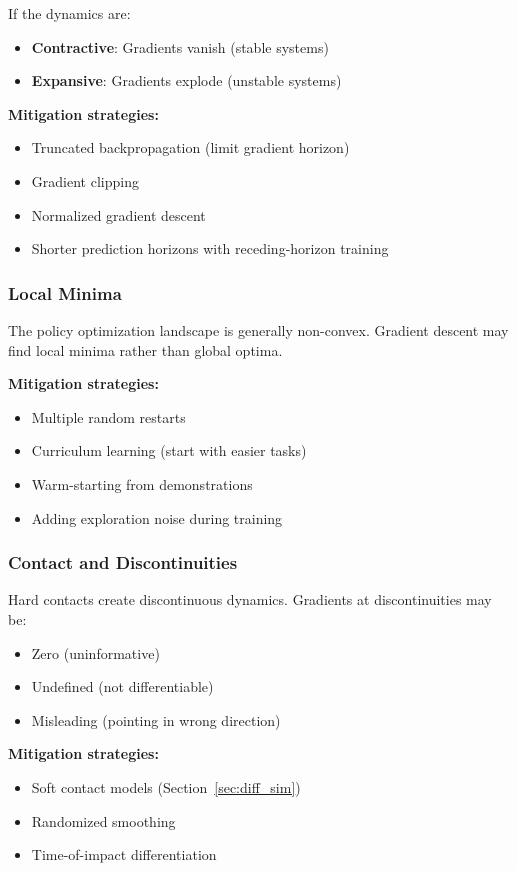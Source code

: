 If the dynamics are:
\begin{itemize}
    \item \textbf{Contractive}: Gradients vanish (stable systems)
    \item \textbf{Expansive}: Gradients explode (unstable systems)
\end{itemize}

\textbf{Mitigation strategies:}
\begin{itemize}
    \item Truncated backpropagation (limit gradient horizon)
    \item Gradient clipping
    \item Normalized gradient descent
    \item Shorter prediction horizons with receding-horizon training
\end{itemize}

\subsubsection{Local Minima}

The policy optimization landscape is generally non-convex. Gradient descent may find local minima rather than global optima.

\textbf{Mitigation strategies:}
\begin{itemize}
    \item Multiple random restarts
    \item Curriculum learning (start with easier tasks)
    \item Warm-starting from demonstrations
    \item Adding exploration noise during training
\end{itemize}

\subsubsection{Contact and Discontinuities}

Hard contacts create discontinuous dynamics. Gradients at discontinuities may be:
\begin{itemize}
    \item Zero (uninformative)
    \item Undefined (not differentiable)
    \item Misleading (pointing in wrong direction)
\end{itemize}

\textbf{Mitigation strategies:}
\begin{itemize}
    \item Soft contact models (Section~\ref{sec:diff_sim})
    \item Randomized smoothing
    \item Time-of-impact differentiation
\end{itemize}

